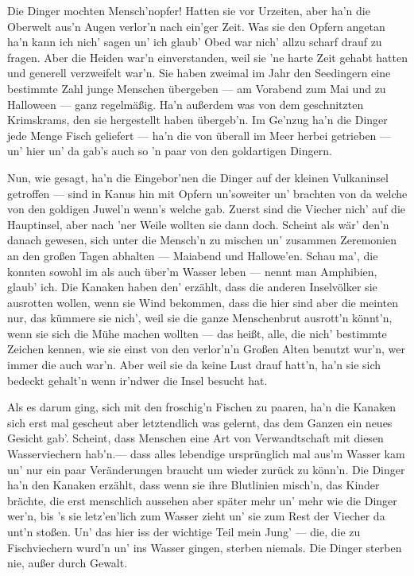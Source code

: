 Die Dinger mochten Mensch'nopfer! Hatten sie vor Urzeiten, aber ha'n die Oberwelt aus'n Augen verlor'n nach ein'ger Zeit. Was sie den Opfern angetan ha'n kann ich nich' sagen un' ich glaub' Obed war nich' allzu scharf drauf zu fragen. Aber die Heiden war'n einverstanden, weil sie 'ne harte Zeit gehabt hatten und generell verzweifelt war'n. Sie haben zweimal im Jahr den Seedingern eine bestimmte Zahl junge Menschen übergeben --- am Vorabend zum Mai und zu Halloween --- ganz regelmäßig. Ha'n außerdem was von dem geschnitzten Krimskrams, den sie hergestellt haben übergeb'n. Im Ge'nzug ha'n die Dinger jede Menge Fisch geliefert --- ha'n die von überall im Meer herbei getrieben --- un' hier un' da gab's auch so 'n paar von den goldartigen Dingern.

Nun, wie gesagt, ha'n die Eingebor'nen die Dinger auf der kleinen Vulkaninsel getroffen --- sind in Kanus hin mit Opfern un'soweiter un' brachten von da welche von den goldigen Juwel'n wenn's welche gab. Zuerst sind die Viecher nich' auf die Hauptinsel, aber nach 'ner Weile wollten sie dann doch. Scheint als wär' den'n danach gewesen, sich unter die Mensch'n zu mischen un' zusammen Zeremonien an den großen Tagen abhalten --- Maiabend und Hallowe'en. Schau ma', die konnten sowohl im als auch über'm Wasser leben --- nennt man Amphibien, glaub' ich. Die Kanaken haben den' erzählt, dass die anderen Inselvölker sie ausrotten wollen, wenn sie Wind bekommen, dass die hier sind aber die meinten nur, das kümmere sie nich', weil sie die ganze Menschenbrut ausrott'n könnt'n, wenn sie sich die Mühe machen wollten --- das heißt, alle, die nich' bestimmte Zeichen kennen, wie sie einst von den verlor'n'n Großen Alten benutzt wur'n, wer immer die auch war'n. Aber weil sie da keine Lust drauf hatt'n, ha'n sie sich bedeckt gehalt'n wenn ir'ndwer die Insel besucht hat.

Als es darum ging, sich mit den froschig'n Fischen zu paaren, ha'n die Kanaken sich erst mal gescheut aber letztendlich was gelernt, das dem Ganzen ein neues Gesicht gab'. Scheint, dass Menschen eine Art von Verwandtschaft mit diesen Wasserviechern hab'n.--- dass alles lebendige ursprünglich mal aus'm Wasser kam un' nur ein paar Veränderungen braucht um wieder zurück zu könn'n. Die Dinger ha'n den Kanaken erzählt, dass wenn sie ihre Blutlinien misch'n, das Kinder brächte, die erst menschlich aussehen aber später mehr un' mehr wie die Dinger wer'n, bis 's sie letz'en'lich zum Wasser zieht un' sie zum Rest der Viecher da unt'n stoßen. Un' das hier iss der wichtige Teil mein Jung' --- die, die zu Fischviechern wurd'n un' ins Wasser gingen, sterben niemals. Die Dinger sterben nie, außer durch Gewalt.

